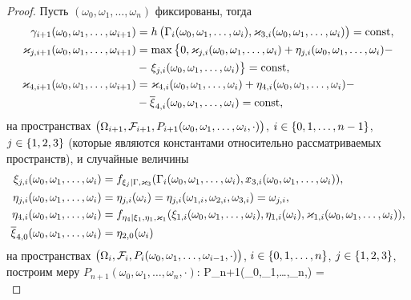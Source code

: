 \documentclass[a4paper,12pt,russian]{extarticle}
\newcommand{\G}{\Gamma}
\begin{document}
\begin{proof}
Пусть $(\omega_0,\omega_1,\ldots, \omega_n)$ фиксированы, тогда
\begin{equation}
\begin{aligned}
\gamma_{i+1}(\omega_0,\omega_1,\ldots,\omega_{i+1})&=h\br{\G_{i}(\omega_0,\omega_1,\ldots,\omega_{i}),\vk_{3,i}(\omega_0,\omega_1,\ldots,\omega_{i})}=\mathrm{const},\\
\vk_{j,i+1}(\omega_0,\omega_1,\ldots,\omega_{i+1})&=\max{\left\{ 0,\vk_{j,i}(\omega_0,\omega_1,\ldots,\omega_{i})+\eta_{j,i}(\omega_0,\omega_1,\ldots,\omega_{i}) - \right.}\\
&-\left.\xi_{j,i}(\omega_0,\omega_1,\ldots,\omega_{i})\right\}=\mathrm{const},\\
\vk_{4,i+1}(\omega_0,\omega_1,\ldots,\omega_{i+1})&=\vk_{4,i}(\omega_0,\omega_1,\ldots,\omega_{i})+\eta_{4,i}(\omega_0,\omega_1,\ldots,\omega_{i})-\\
&-\overline{\xi}_{4,i}(\omega_0,\omega_1,\ldots,\omega_{i}) = \mathrm{const},
\end{aligned}
\label{functionsTwo}
\end{equation}
на пространствах $\left(\Omega_{i+1}, {\cal F}_{i+1},P_{i+1}(\omega_0, \omega_1, \ldots, \omega_{i},\cdot)\right)$, $i\in \left\{0,1,\ldots,n-1\right\}$, $j\in \left\{1,2,3\right\}$ (которые являются константами относительно рассматриваемых пространств), и случайные величины 
\begin{equation}
\begin{aligned}
\xi_{j,i}(\omega_0,\omega_1,\ldots,\omega_i)&=f_{\xi_j | \G,\vk_3} (\G_i(\omega_0,\omega_1,\ldots,\omega_i),x_{3,i}(\omega_0,\omega_1,\ldots,\omega_i)),\\
\eta_{j,i}(\omega_0,\omega_1,\ldots,\omega_i)&=\eta_{j,i}(\omega_i)=\eta_{j,i}(\omega_{1,i},\omega_{2,i},\omega_{3,i})=\omega_{j,i}, \\
\eta_{4,i}(\omega_0,\omega_1,\ldots,\omega_i)&=f_{\eta_4| \xi_1, \eta_1, \vk_1} (\xi_{1,i}(\omega_0,\omega_1,\ldots,\omega_i),\eta_{1,i}(\omega_i),\vk_{1,i}(\omega_0,\omega_1,\ldots,\omega_i)),\\
\overline{\xi}_{4,0}(\omega_0,\omega_1,\ldots,\omega_i)&=\eta_{2,0}(\omega_i)
\end{aligned}
\label{functionsThree}
\end{equation}
на пространствах  $\left(\Omega_{i}, {\cal F}_{i},P_{i}(\omega_0, \omega_1, \ldots, \omega_{i-1},\cdot)\right)$, $i\in \left\{0,1,\ldots,n\right\}$, $j\in \left\{1,2,3\right\}$, построим меру $P_{n+1}(\omega_0, \omega_1, \ldots, \omega_{n},\cdot)$:
\ml
{
P_{n+1}(\omega_0,\omega_1,\ldots,\omega_n,) = \\
}
\end{proof}
\end{document}
